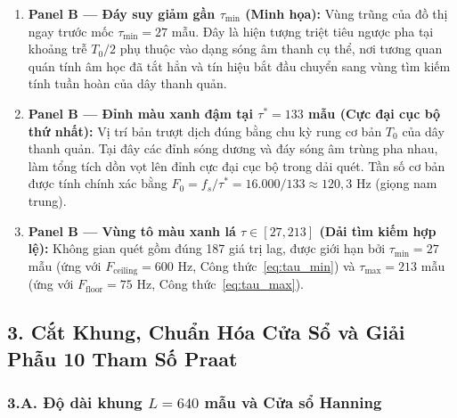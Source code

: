 \documentclass[11pt,a4paper]{article}
\begin{document}
\begin{enumerate}
    \item \textbf{Panel B --- Đáy suy giảm gần $\tau_{\min}$ (Minh họa):} Vùng trũng của đồ thị ngay trước mốc $\tau_{\min} = 27$ mẫu. Đây là hiện tượng triệt tiêu ngược pha tại khoảng trễ $T_0/2$ phụ thuộc vào dạng sóng âm thanh cụ thể, nơi tương quan quán tính âm học đã tắt hẳn và tín hiệu bắt đầu chuyển sang vùng tìm kiếm tính tuần hoàn của dây thanh quản.
    \item \textbf{Panel B --- Đỉnh màu xanh đậm tại $\tau^* = 133$ mẫu (Cực đại cục bộ thứ nhất):} Vị trí bản trượt dịch đúng bằng chu kỳ rung cơ bản $T_0$ của dây thanh quản. Tại đây các đỉnh sóng dương và đáy sóng âm trùng pha nhau, làm tổng tích dồn vọt lên đỉnh cực đại cục bộ trong dải quét. Tần số cơ bản được tính chính xác bằng $F_0 = f_s / \tau^* = 16.000 / 133 \approx 120{,}3\text{ Hz}$ (giọng nam trung).
    \item \textbf{Panel B --- Vùng tô màu xanh lá $\tau \in [27, 213]$ (Dải tìm kiếm hợp lệ):} Không gian quét gồm đúng 187 giá trị lag, được giới hạn bởi $\tau_{\min} = 27$ mẫu (ứng với $F_{\text{ceiling}} = 600\text{ Hz}$, Công thức~\eqref{eq:tau_min}) và $\tau_{\max} = 213$ mẫu (ứng với $F_{\text{floor}} = 75\text{ Hz}$, Công thức~\eqref{eq:tau_max}).
\end{enumerate}

\subsection*{3. Cắt Khung, Chuẩn Hóa Cửa Sổ và Giải Phẫu 10 Tham Số Praat}

\subsubsection*{3.A. Độ dài khung $L = 640$ mẫu và Cửa sổ Hanning}
\end{document}
